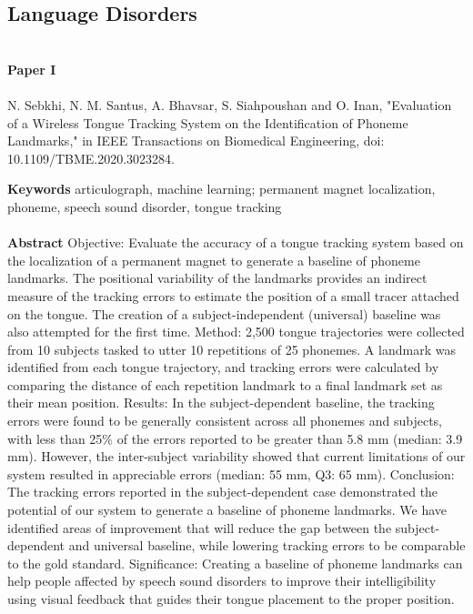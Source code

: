 \subsection{Language Disorders}
\noindent
\\ 
\textbf{Paper I} 
\\ \\
\noindent
N. Sebkhi, N. M. Santus, A. Bhavsar, S. Siahpoushan and O. Inan, "Evaluation of a Wireless Tongue Tracking System on the Identification of Phoneme Landmarks," in IEEE Transactions on Biomedical Engineering, doi: 10.1109/TBME.2020.3023284.

\noindent
\textbf{Keywords} articulograph, machine learning; permanent magnet localization, phoneme, speech sound disorder, tongue tracking
\\ \\

\noindent
\textbf{Abstract} Objective: Evaluate the accuracy of a tongue tracking system based on the localization of a permanent magnet to generate a baseline of phoneme landmarks. The positional variability of the landmarks provides an indirect measure of the tracking errors to estimate the position of a small tracer attached on the tongue. The creation of a subject-independent (universal) baseline was also attempted for the first time. Method: 2,500 tongue trajectories were collected from 10 subjects tasked to utter 10 repetitions of 25 phonemes. A landmark was identified from each tongue trajectory, and tracking errors were calculated by comparing the distance of each repetition landmark to a final landmark set as their mean position. Results: In the subject-dependent baseline, the tracking errors were found to be generally consistent across all phonemes and subjects, with less than 25\% of the errors reported to be greater than 5.8 mm (median: 3.9 mm). However, the inter-subject variability showed that current limitations of our system resulted in appreciable errors (median: 55 mm, Q3: 65 mm). Conclusion: The tracking errors reported in the subject-dependent case demonstrated the potential of our system to generate a baseline of phoneme landmarks. We have identified areas of improvement that will reduce the gap between the subject-dependent and universal baseline, while lowering tracking errors to be comparable to the gold standard. Significance: Creating a baseline of phoneme landmarks can help people affected by speech sound disorders to improve their intelligibility using visual feedback that guides their tongue placement to the proper position.\\ \\

